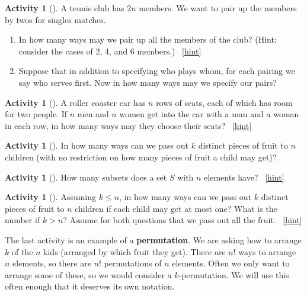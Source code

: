 \documentclass[10pt,]{book}
\newcommand{\terminology}[1]{\textbf{#1}}
\theoremstyle{plain}
\theoremstyle{definition}
\theoremstyle{definition}
\theoremstyle{definition}
\newtheorem{activity}[project]{Activity}
\numberwithin{equation}{chapter}
\begin{document}
\begin{activity}[]\label{tennispairings1}
\hypertarget{p-637}{}%
A tennis club has \(2n\) members. We want to pair up the members by twos for singles matches.%
\begin{enumerate}[font=\bfseries,label=(\alph*),ref=\alph*]
\item\label{task-133} \hypertarget{p-638}{}%
In how many ways may we pair up all the members of the club? (Hint: consider the cases of 2, 4, and 6 members.)%
~\hfill{\tiny\hyperlink{a-86.a}{[hint]}\hypertarget{q-86.a}{}}\item\label{task-134} \hypertarget{p-641}{}%
Suppose that in addition to specifying who plays whom, for each pairing we say who serves first.  Now in how many ways may we specify our pairs?%
\end{enumerate}
\end{activity}
\begin{activity}[]\label{activity-80}
\hypertarget{p-642}{}%
A roller coaster car has \(n\) rows of seats, each of which has room for two people. If \(n\) men and \(n\) women get into the car with a man and a woman in each row, in how many ways may they choose their seats?%
~\hfill{\tiny\hyperlink{a-87}{[hint]}\hypertarget{q-87}{}}\end{activity}
\begin{activity}[]\label{activity-81}
\hypertarget{p-645}{}%
In how many ways can we pass out \(k\) distinct pieces of fruit to \(n\) children (with no restriction on how many pieces of fruit a child may get)?%
\end{activity}
\begin{activity}[]\label{SubsetsFirstTime}
\hypertarget{p-647}{}%
How many subsets does a set \(S\) with \(n\) elements have?%
~\hfill{\tiny\hyperlink{a-89}{[hint]}\hypertarget{q-89}{}}\end{activity}
\begin{activity}[]\label{activity-83}
\hypertarget{p-650}{}%
Assuming \(k\le n\), in how many ways can we pass out \(k\) distinct pieces of fruit to \(n\) children if each child may get at most one? What is the number if \(k>n\)? Assume for both questions that we pass out all the fruit.%
~\hfill{\tiny\hyperlink{a-90}{[hint]}\hypertarget{q-90}{}}\end{activity}
\hypertarget{p-654}{}%
The last activity is an example of a \terminology{permutation}.  We are asking how to arrange \(k\) of the \(n\) kids (arranged by which fruit they get).  There are \(n!\) ways to arrange \(n\) elements, so there are \(n!\) permutations of \(n\) elements.  Often we only want to arrange some of these, so we would consider a \(k\)-permutation.   We will use this often enough that it deserves its own notation.%
\end{document}
